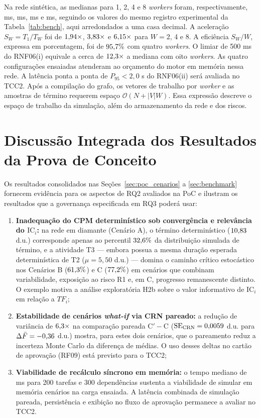 \documentclass[12pt,openany,oneside,a4paper,english,brazilian,sumario=tradicional]{abntex2}
\newcommand{\IC}{\mathrm{IC}}
\begin{document}
Na rede sintética, as medianas para 1, 2, 4 e 8 \textit{workers} foram, respectivamente, \benchSynthWOneMedMs{} ms, \benchSynthWTwoMedMs{} ms, \benchSynthWFourMedMs{} ms e \benchSynthWEightMedMs{} ms, seguindo os valores do mesmo registro experimental da Tabela~\ref{tab:bench}, aqui arredondados a uma casa decimal. A aceleração $S_W=T_1/T_W$ foi de $1{,}94{}\times$, $3{,}83{}\times$ e $6{,}15{}\times$ para $W=2$, 4 e 8. A eficiência $S_W/W$, expressa em porcentagem, foi de $95{,}7{}\%$ com quatro \textit{workers}. O limiar de 500 ms do RNF06(i) equivale a cerca de $12{,}3{}\times$ a mediana com oito \textit{workers}. As quatro configurações ensaiadas atenderam ao orçamento do motor em memória nessa rede. A latência ponta a ponta de $P_{95}<2{,}0$ s do RNF06(ii) será avaliada no TCC2. Após a compilação do grafo, os vetores de trabalho por \textit{worker} e as amostras de término requerem espaço $\mathcal{O}(N+|V|W)$. Essa expressão descreve o espaço de trabalho da simulação, além do armazenamento da rede e dos riscos.

\section{Discussão Integrada dos Resultados da Prova de Conceito}\label{sec:discussao_poc}

Os resultados consolidados nas Seções~\ref{sec:poc_cenarios} a \ref{sec:benchmark} fornecem evidência para os aspectos de RQ2 avaliados na PoC e ilustram os resultados que a governança especificada em RQ3 poderá usar:
\begin{enumerate}
  \item \textbf{Inadequação do CPM determinístico sob convergência e relevância do $\IC_i$:} na rede em diamante (Cenário A), o término determinístico ($10{,}83{}$ d.u.) corresponde apenas ao percentil $32{,}6{}\%$ da distribuição simulada de término, e a atividade T3 --- embora possua a mesma duração esperada determinística de T2 ($\mu=5{,}50$ d.u.) --- domina o caminho crítico estocástico nos Cenários B ($61{,}3{}\%$) e C ($77{,}2{}\%$) em cenários que combinam variabilidade, exposição ao risco R1 e, em C, progresso remanescente distinto. O exemplo motiva a análise exploratória H2b sobre o valor informativo de $\IC_i$ em relação a $TF_i$;
  \item \textbf{Estabilidade de cenários \textit{what-if} via CRN pareado:} a redução de variância de $6{,}3{}\times$ na comparação pareada $\text{C}' - \text{C}$ ($\mathrm{SE}_{\mathrm{CRN}} = 0{,}0059{}$ d.u. para $\Delta\bar{F} = -0{,}36{}$ d.u.) mostra, para estes dois cenários, que o pareamento reduz a incerteza Monte Carlo da diferença de médias. O uso desses deltas no cartão de aprovação (RF09) está previsto para o TCC2;
  \item \textbf{Viabilidade de recálculo síncrono em memória:} o tempo mediano de \benchSynthWEightMedMs{} ms para 200 tarefas e 300 dependências sustenta a viabilidade de simular em memória cenários na carga ensaiada. A latência combinada de simulação pareada, persistência e exibição no fluxo de aprovação permanece a avaliar no TCC2.
\end{enumerate}
\end{document}
